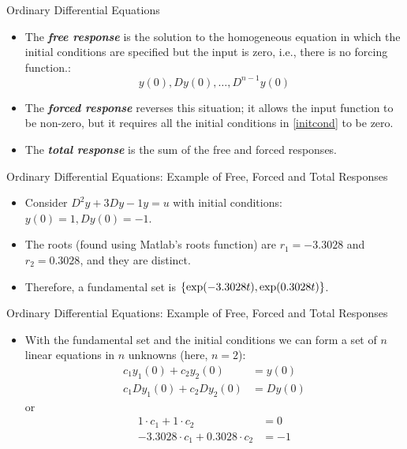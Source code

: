\begin{frame}
Ordinary Differential Equations
 \begin{itemize}
 \item The \textit{\textbf{free response}} is the solution to the homogeneous
 equation in which the initial conditions are specified but the input is zero, i.e., there is no forcing function.:
\begin{equation}\label{initcond}
  y(0),Dy(0),\ldots,D^{n-1}y(0)
\end{equation}
 \item The \textit{\textbf{forced response}} reverses this situation; it allows the
 input function to be non-zero, but it requires all the initial
 conditions in \eqref{initcond} to be zero.
 \item The \textit{\textbf{total response}} is the sum of the free and forced
 responses.
\end{itemize}
\end{frame}
\begin{frame}
Ordinary Differential Equations: Example of Free, Forced and Total
Responses
 \begin{itemize}
 \item Consider $D^2y+3Dy-1y=u$ with initial conditions:
 $y(0)=1,Dy(0)=-1$.
 \item The roots (found using Matlab's roots function) are $r_1=-3.3028$ and $r_2=0.3028$, and they are
 distinct.
 \item Therefore, a fundamental set is
 $\left\{\exp(-3.3028t),\exp(0.3028t)\right\}$.
\end{itemize}
\end{frame}
\begin{frame}
Ordinary Differential Equations: Example of Free, Forced and Total
Responses
 \begin{itemize}
 \item With the fundamental set and the initial conditions we can
 form a set of $n$ linear equations in $n$ unknowns (here, $n=2$):
\begin{align*}
  c_1y_1(0)+c_2y_2(0) & =y(0) \\
  c_1Dy_1(0)+c_2Dy_2(0) & =Dy(0)
\end{align*}
or
\begin{align*}
  1\cdot c_1+1\cdot c_2 & =0 \\
  -3.3028\cdot c_1+0.3028\cdot c_2 & =-1
\end{align*}
\end{itemize}
\end{frame}
